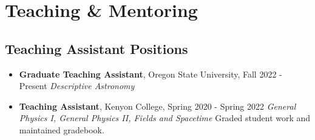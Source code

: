 \documentclass[11pt,letterpaper,sans,unicode]{moderncv}
\newcommand{\blucirc}{{\color{color1} $\circ\;\;$}}
\begin{document}
%

\section{Teaching \& Mentoring}

\subsection{Teaching Assistant Positions}
	\renewcommand\labelitemi{\blucirc}
	\begin{itemize}[leftmargin=8mm]
	\setlength\itemsep{1mm}
	\item \textbf{\color{color1} Graduate Teaching Assistant}, Oregon State University, \hfill Fall 2022 - Present
        		\newline  \textit{Descriptive Astronomy }
	\item \textbf{\color{color1} Teaching Assistant}, Kenyon College, \hfill Spring 2020 - Spring 2022
        		\newline  \textit{General Physics I, General Physics II, Fields and Spacetime}
			\newline Graded student work and maintained gradebook.
	\end{itemize}




\end{document}
